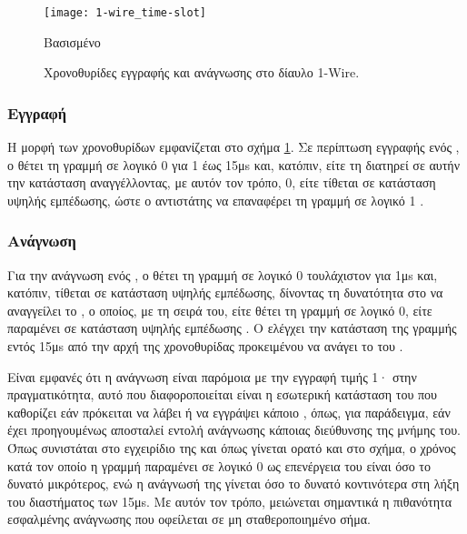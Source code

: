 \begin{figure}
    \caption{Χρονοθυρίδες εγγραφής και ανάγνωσης στο δίαυλο 1-Wire.
    \label{fig:1-wire:time-slot}}
    \begin{center}
    \texttt{[image: 1-wire\_time-slot]}
    \end{center}
    Βασισμένο 
\end{figure}


\subsubsection{Εγγραφή}

Η μορφή των χρονοθυρίδων εμφανίζεται στο σχήμα \ref{fig:1-wire:time-slot}. Σε
περίπτωση εγγραφής ενός , ο  θέτει τη γραμμή σε λογικό 0 για
1 έως 15μs και, κατόπιν, είτε τη διατηρεί σε αυτήν την κατάσταση αναγγέλλοντας,
με αυτόν τον τρόπο,  0, είτε τίθεται σε κατάσταση υψηλής εμπέδωσης, ώστε
ο αντιστάτης  να επαναφέρει τη γραμμή σε λογικό 1
\parencite[2]{atmel04}.


\subsubsection{Ανάγνωση}

Για την ανάγνωση ενός , ο  θέτει τη γραμμή σε λογικό 0
τουλάχιστον για 1μs και, κατόπιν, τίθεται σε κατάσταση υψηλής εμπέδωσης,
δίνοντας τη δυνατότητα στο  να αναγγείλει το , ο οποίος, με τη
σειρά του, είτε θέτει τη γραμμή σε λογικό 0, είτε παραμένει σε κατάσταση υψηλής
εμπέδωσης \parencite[2]{atmel04}. Ο  ελέγχει την κατάσταση της
γραμμής εντός 15μs από την αρχή της χρονοθυρίδας \parencite[17]{ds18b20}
προκειμένου να ανάγει το  του .

Είναι εμφανές ότι η ανάγνωση είναι παρόμοια με την εγγραφή  τιμής 1·
στην πραγματικότητα, αυτό που διαφοροποιείται είναι η εσωτερική κατάσταση του
 που καθορίζει εάν πρόκειται να λάβει ή να εγγράψει κάποιο ,
όπως, για παράδειγμα, εάν έχει προηγουμένως αποσταλεί εντολή ανάγνωσης κάποιας
διεύθυνσης της μνήμης του.
Όπως συνιστάται στο εγχειρίδιο της \textcite[17]{ds18b20} και όπως γίνεται ορατό
και στο σχήμα, ο χρόνος κατά τον οποίο η γραμμή παραμένει σε λογικό 0 ως
επενέργεια του  είναι όσο το δυνατό μικρότερος, ενώ η ανάγνωσή της
γίνεται όσο το δυνατό κοντινότερα στη λήξη του διαστήματος των 15μs. Με αυτόν
τον τρόπο, μειώνεται σημαντικά η πιθανότητα εσφαλμένης ανάγνωσης που οφείλεται
σε μη σταθεροποιημένο σήμα.

